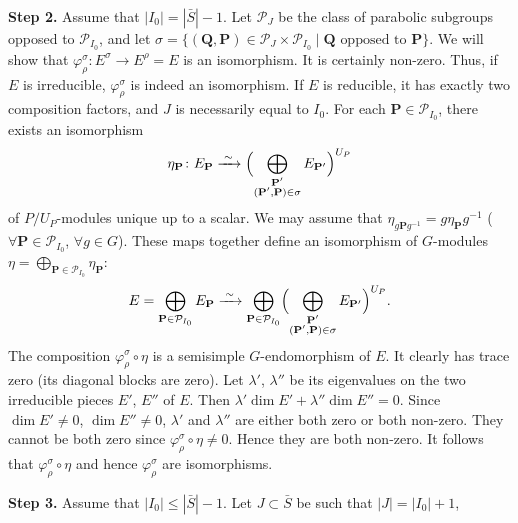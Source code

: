 \documentclass[10pt,a4paper]{article}
\theoremstyle{plain}
\theoremstyle{definition}
\theoremstyle{remark}
\newcommand{\cP}{\mathcal{P}}
\newcommand{\bP}{\mathbf{P}}
\newcommand{\bQ}{\mathbf{Q}}
\begin{document}
\smallskip
\noindent\textbf{Step 2.} Assume that $|I_0| = |\bar S| - 1$. Let $\cP_J$ be the class of parabolic subgroups opposed to $\cP_{I_0}$, and let $\sigma = \{(\bQ,\bP) \in \cP_J \times \cP_{I_0} \mid \text{$\bQ$ opposed to $\bP$}\}$. We will show that $\varphi_\rho^\sigma \colon E^\sigma \to E^\rho = E$ is an isomorphism. It is certainly non-zero. Thus, if $E$ is irreducible, $\varphi_\rho^\sigma$ is indeed an isomorphism. If $E$ is reducible, it has exactly two composition factors, and $J$ is necessarily equal to $I_0$. For each $\bP \in \cP_{I_0}$, there exists an isomorphism
\begin{equation*}
\eta_{\bP} \colon E_{\bP} \xrightarrow{\;\sim\;} \Bigl(\bigoplus_{\substack{\bP'\\(\bP',\bP) \in \sigma}} E_{\bP'}\Bigr)^{U_P}
\end{equation*}
of $P/U_P$-modules unique up to a scalar. We may assume that $\eta_{g\bP g^{-1}} = g\eta_{\bP} g^{-1}$ ($\forall \bP \in \cP_{I_0}$, $\forall g \in G$). These maps together define an isomorphism of $G$-modules $\eta = \bigoplus_{\bP \in \cP_{I_0}} \eta_{\bP}$:
\begin{equation*}
E = \bigoplus_{\bP \in \cP_{I_0}} E_{\bP}
\xrightarrow{\;\sim\;}
\bigoplus_{\bP\in\cP_{I_0}}\Bigl(\bigoplus_{\substack{\bP'\\(\bP',\bP)\in\sigma}}E_{\bP'}\Bigr)^{U_P}.
\end{equation*}
The composition $\varphi_\rho^\sigma \circ \eta$ is a semisimple $G$-endomorphism of $E$. It clearly has trace zero (its diagonal blocks are zero). Let $\lambda'$, $\lambda''$ be its eigenvalues on the two irreducible pieces $E'$, $E''$ of $E$. Then $\lambda' \dim E' + \lambda'' \dim E'' = 0$. Since $\dim E' \neq 0$, $\dim E'' \neq 0$, $\lambda'$ and $\lambda''$ are either both zero or both non-zero. They cannot be both zero since $\varphi_\rho^\sigma \circ \eta \neq 0$. Hence they are both non-zero. It follows that $\varphi_\rho^\sigma \circ \eta$ and hence $\varphi_\rho^\sigma$ are isomorphisms.

\smallskip
\noindent\textbf{Step 3.} Assume that $|I_0| \leq |\bar S| - 1$. Let $J \subset \bar S$ be such that $|J| = |I_0| + 1$,
\end{document}
